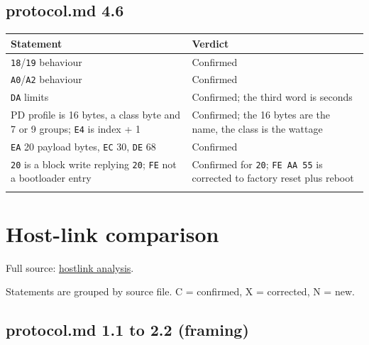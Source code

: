 \subsection{protocol.md 4.6}\label{protocol.md-4.6}

{\def\LTcaptype{none} %
\begin{longtable}[]{@{}
  >{\raggedright\arraybackslash}p{}
  >{\raggedright\arraybackslash}p{}@{}}
\toprule\noalign{}
\begin{minipage}[b]{\linewidth}\raggedright
Statement
\end{minipage} & \begin{minipage}[b]{\linewidth}\raggedright
Verdict
\end{minipage} \\
\midrule\noalign{}
\endhead
\bottomrule\noalign{}
\endlastfoot
\texttt{18}/\texttt{19} behaviour & Confirmed \\
\texttt{A0}/\texttt{A2} behaviour & Confirmed \\
\texttt{DA} limits & Confirmed; the third word is seconds \\
PD profile is 16 bytes, a class byte and 7 or 9 groups; \texttt{E4} is
index + 1 & Confirmed; the 16 bytes are the name, the class is the
wattage \\
\texttt{EA} 20 payload bytes, \texttt{EC} 30, \texttt{DE} 68 &
Confirmed \\
\texttt{20} is a block write replying \texttt{20}; \texttt{FE} not a
bootloader entry & Confirmed for \texttt{20}; \texttt{FE\ AA\ 55} is
corrected to factory reset plus reboot \\*
\end{longtable}
}

\section{Host-link comparison}\label{host-link-comparison}

Full source: \href{notes/hostlink.md}{hostlink analysis}.

Statements are grouped by source file. C = confirmed, X = corrected, N =
new.

\subsection{protocol.md 1.1 to 2.2
(framing)}\label{protocol.md-1.1-to-2.2-framing}

